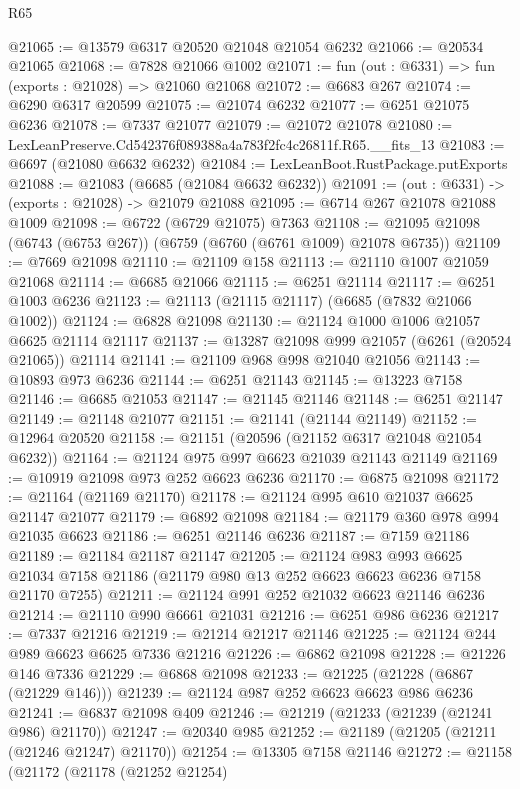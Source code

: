 \begin{lexlean}{R65}
\begin{coremodule}
{@21065 := @13579 @6317 @20520 @21048 @21054 @6232
@21066 := @20534 @21065
@21068 := @7828 @21066 @1002
@21071 := fun (out : @6331) => fun (exports : @21028) => @21060 @21068
@21072 := @6683 @267
@21074 := @6290 @6317 @20599
@21075 := @21074 @6232
@21077 := @6251 @21075 @6236
@21078 := @7337 @21077
@21079 := @21072 @21078
@21080 := LexLeanPreserve.Cd542376f089388a4a783f2fc4c26811f.R65.__fits_13
@21083 := @6697 (@21080 @6632 @6232)
@21084 := LexLeanBoot.RustPackage.putExports
@21088 := @21083 (@6685 (@21084 @6632 @6232))
@21091 := (out : @6331) -> (exports : @21028) -> @21079 @21088
@21095 := @6714 @267 @21078 @21088 @1009
@21098 := @6722 (@6729 @21075) @7363
@21108 := @21095 @21098 (@6743 (@6753 @267)) (@6759 (@6760 (@6761 @1009) @21078 @6735))
@21109 := @7669 @21098
@21110 := @21109 @158
@21113 := @21110 @1007 @21059 @21068
@21114 := @6685 @21066
@21115 := @6251 @21114
@21117 := @6251 @1003 @6236
@21123 := @21113 (@21115 @21117) (@6685 (@7832 @21066 @1002))
@21124 := @6828 @21098
@21130 := @21124 @1000 @1006 @21057 @6625 @21114 @21117
@21137 := @13287 @21098 @999 @21057 (@6261 (@20524 @21065)) @21114
@21141 := @21109 @968 @998 @21040 @21056
@21143 := @10893 @973 @6236
@21144 := @6251 @21143
@21145 := @13223 @7158
@21146 := @6685 @21053
@21147 := @21145 @21146
@21148 := @6251 @21147
@21149 := @21148 @21077
@21151 := @21141 (@21144 @21149)
@21152 := @12964 @20520
@21158 := @21151 (@20596 (@21152 @6317 @21048 @21054 @6232))
@21164 := @21124 @975 @997 @6623 @21039 @21143 @21149
@21169 := @10919 @21098 @973 @252 @6623 @6236
@21170 := @6875 @21098
@21172 := @21164 (@21169 @21170)
@21178 := @21124 @995 @610 @21037 @6625 @21147 @21077
@21179 := @6892 @21098
@21184 := @21179 @360 @978 @994 @21035 @6623
@21186 := @6251 @21146 @6236
@21187 := @7159 @21186
@21189 := @21184 @21187 @21147
@21205 := @21124
    @983
    @993
    @6625
    @21034
    @7158
    @21186
    (@21179 @980 @13 @252 @6623 @6623 @6236 @7158 @21170 @7255)
@21211 := @21124 @991 @252 @21032 @6623 @21146 @6236
@21214 := @21110 @990 @6661 @21031
@21216 := @6251 @986 @6236
@21217 := @7337 @21216
@21219 := @21214 @21217 @21146
@21225 := @21124 @244 @989 @6623 @6625 @7336 @21216
@21226 := @6862 @21098
@21228 := @21226 @146 @7336
@21229 := @6868 @21098
@21233 := @21225 (@21228 (@6867 (@21229 @146)))
@21239 := @21124 @987 @252 @6623 @6623 @986 @6236
@21241 := @6837 @21098 @409
@21246 := @21219 (@21233 (@21239 (@21241 @986) @21170))
@21247 := @20340 @985
@21252 := @21189 (@21205 (@21211 (@21246 @21247) @21170))
@21254 := @13305 @7158 @21146
@21272 := @21158
    (@21172
      (@21178
        (@21252 @21254)
}
\end{coremodule}
\end{lexlean}
